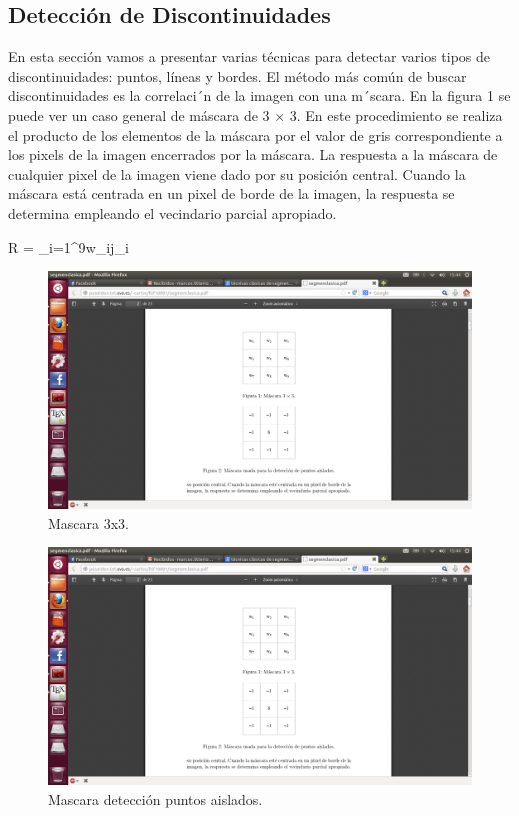 \documentclass[14pt]{article}
\begin{document}
\subsection{Detección de Discontinuidades}

En esta sección vamos a presentar varias técnicas para detectar varios tipos de discontinuidades: puntos, líneas y bordes. El método más común de buscar discontinuidades es la correlaci´n de la imagen con una m´scara. En la ﬁgura 1 se puede ver un caso general de máscara de 3 × 3. En este procedimiento se realiza el producto de los elementos de la máscara por el valor de gris correspondiente a los pixels de la imagen encerrados por la máscara. La respuesta a la máscara de cualquier pixel de la imagen viene dado por su posición central. Cuando la máscara está centrada en un pixel de borde de la imagen, la respuesta se determina empleando el vecindario parcial apropiado.

\begin{center}
R = \sum_{i=1}^9{w_ij_i}
\end{center}

\begin{figure}[h]
	\begin{center}
		\includegraphics[scale=.1]{./Imagenes/mascara3x3.png}
		\caption{Mascara 3x3.}
	\end{center}
\end{figure} 

\begin{figure}[h]
	\begin{center}
		\includegraphics[scale=.1]{./Imagenes/mascaraputosaislados.png}
		\caption{Mascara detección puntos aislados.}
	\end{center}
\end{figure} 
\end{document}

